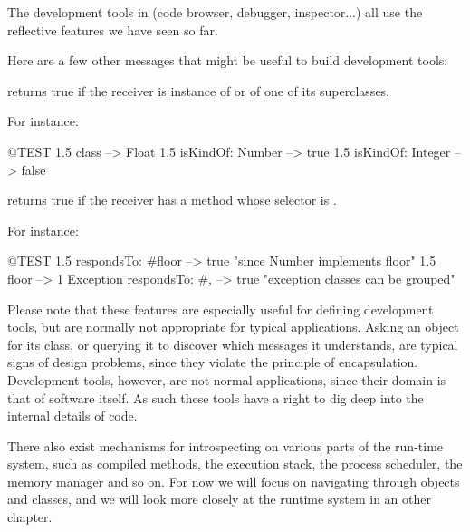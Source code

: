 \documentclass[a4paper,10pt,twoside]{book}
\begin{document}
The development tools in \squeak (code browser, debugger, inspector...) all use the reflective features we have seen so far.

Here are a few other messages that might be useful to build development tools:


 returns true if the receiver is instance of  or of one of its superclasses.

For instance:
\begin{code}{@TEST}
1.5 class                     --> Float
1.5 isKindOf: Number --> true
1.5 isKindOf: Integer   --> false
\end{code}


 returns true if the receiver has a method whose selector is .

For instance:
\begin{code}{@TEST}
1.5 respondsTo: #floor      --> true    "since Number implements floor"
1.5 floor                            --> 1
Exception respondsTo: #, --> true    "exception classes can be grouped"
\end{code}

Please note that these features are especially useful for defining development tools, but are normally not appropriate for typical applications.
Asking an object for its class, or querying it to discover which messages it understands, are typical signs of design problems, since they violate the principle of encapsulation.
Development tools, however, are not normal applications, since their domain is that of software itself. As such these tools have a right to dig deep into the internal details of code.



There also exist mechanisms for introspecting on various parts of the run-time system, such as compiled methods, the execution stack, the process scheduler, the memory manager and so on. For now we will focus on navigating through objects and classes, and we will look more closely at the runtime system in an other chapter.
\end{document}
